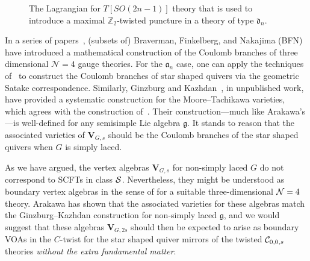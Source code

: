 \documentclass[a4paper]{article}
\def\CC{{\cal C}}
\def\NN{{\cal N}}
\def\SS{{\cal S}}
\def\af{\mathfrak{a}}
\def\df{\mathfrak{d}}
\def\gf{\mathfrak{g}}
\def\V{\mathbf{V}}
\begin{document}
\begin{figure}[!t]
	\centering

	\caption{\label{fig:t-tail}The Lagrangian for $T[SO(2n-1)]$ theory that is used to introduce a maximal $\mathbb{Z}_2$-twisted puncture in a theory of type $\df_n$.}
\end{figure}

In a series of papers~\cite{Nakajima:2015txa,Braverman:2016wma,Braverman:2016pwk, Braverman:2017ofm}, (subsets of) Braverman, Finkelberg, and Nakajima (BFN) have introduced a mathematical construction of the Coulomb branches of three dimensional $\mathcal{N}=4$ gauge theories. For the $\af_n$ case, one can apply the techniques of~\cite{Braverman:2017ofm} to construct the Coulomb branches of star shaped quivers via the geometric Satake correspondence. Similarly, Ginzburg and Kazhdan~\cite{Ginzburg:2018}, in unpublished work, have provided a systematic construction for the Moore--Tachikawa varieties, which agrees with the construction of~\cite{Braverman:2017ofm}. Their construction---much like Arakawa's---is well-defined for any semisimple Lie algebra $\gf$. It stands to reason that the associated varieties of $\V_{G,s}$ should be the Coulomb branches of the star shaped quivers when $G$ is simply laced.

As we have argued, the vertex algebras $\V_{G,s}$ for non-simply laced $G$ do not correspond to SCFTs in class $\SS$. Nevertheless, they might be understood as boundary vertex algebras in the sense of \cite{Gaiotto:2016wcv,Costello:2018swh,Costello:2019} for a suitable three-dimensional $\NN=4$ theory. Arakawa has shown that the associated varieties for these algebras match the Ginzburg--Kazhdan construction for non-simply laced $\gf$, and we would suggest that these algebras $\V_{G,2s}$ should then be expected to arise as boundary VOAs in the $C$-twist for the star shaped quiver mirrors of the twisted $\CC_{0,0,s}$ theories \textit{without the extra fundamental matter}.
\end{document}
